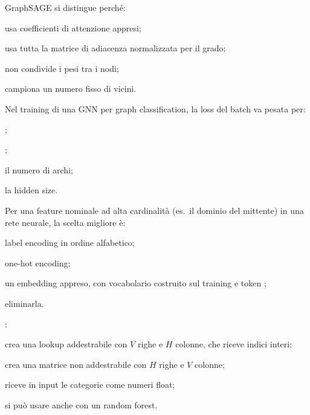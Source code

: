 \begin{domanda}[GNN]\label{quiz:m31}
GraphSAGE si distingue perché:
\begin{opzioni}
  \item usa coefficienti di attenzione appresi;
  \item usa tutta la matrice di adiacenza normalizzata per il grado;
  \item non condivide i pesi tra i nodi;
  \item campiona un numero fisso di vicini.
\end{opzioni}
\end{domanda}

\begin{domanda}\label{quiz:m32}
Nel training di una GNN per graph classification, la loss del batch va pesata per:
\begin{opzioni}
  \item {};
  \item {};
  \item il numero di archi;
  \item la hidden size.
\end{opzioni}
\end{domanda}

\begin{domanda}[embedding]\label{quiz:m33}
Per una feature nominale ad alta cardinalità (es.\ il dominio del mittente) in una rete neurale, la scelta migliore è:
\begin{opzioni}
  \item label encoding in ordine alfabetico;
  \item one-hot encoding;
  \item un embedding appreso, con vocabolario costruito sul training e token ;
  \item eliminarla.
\end{opzioni}
\end{domanda}

\begin{domanda}[embedding]\label{quiz:m34}
:
\begin{opzioni}
  \item crea una lookup addestrabile con $V$ righe e $H$ colonne, che riceve indici interi;
  \item crea una matrice non addestrabile con $H$ righe e $V$ colonne;
  \item riceve in input le categorie come numeri float;
  \item si può usare anche con un random forest.
\end{opzioni}
\end{domanda}

